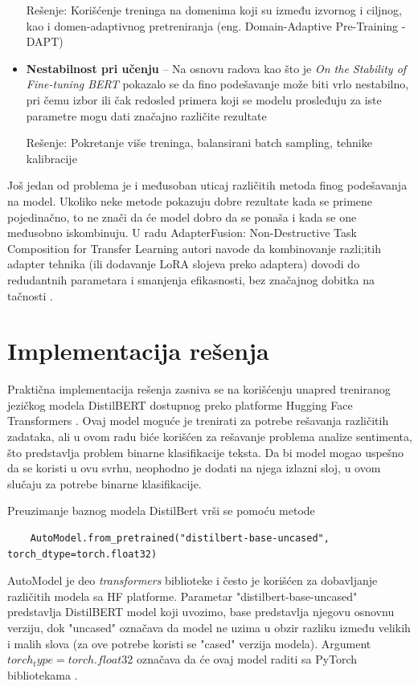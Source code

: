 \documentclass[12pt,oneside]{memoir}
\begin{document}
\begin{itemize}
	Rešenje: Korišćenje treninga na domenima koji su između izvornog i ciljnog, kao i domen-adaptivnog pretreniranja (eng. Domain-Adaptive Pre-Training - DAPT) \cite{ding2023diagnosing}
	
	\item \textbf{Nestabilnost pri učenju} – Na osnovu radova kao što je \textit{On the Stability of Fine-tuning BERT} pokazalo se da fino podešavanje može biti vrlo nestabilno, pri čemu izbor ili čak redosled primera koji se modelu prosleđuju za iste parametre mogu dati značajno različite rezultate
	
	Rešenje: Pokretanje više treninga, balansirani batch sampling, tehnike kalibracije \cite{2025calibration}
	
\end{itemize}


Još jedan od problema je i međusoban uticaj različitih metoda finog podešavanja na model. Ukoliko neke metode pokazuju dobre rezultate kada se primene pojedinačno, to ne znači da će model dobro da se ponaša i kada se one međusobno iskombinuju. U radu AdapterFusion: Non-Destructive Task Composition for Transfer Learning autori navode da kombinovanje razli;itih adapter tehnika (ili dodavanje LoRA slojeva preko adaptera) dovodi do redudantnih parametara i smanjenja efikasnosti, bez značajnog dobitka na tačnosti \cite{pfeiffer2021adapternondestructive}.


\chapter{Implementacija rešenja}
Praktična implementacija rešenja zasniva se na korišćenju unapred treniranog jezičkog modela DistilBERT dostupnog preko platforme Hugging Face Transformers \cite{Huggingface2023}. Ovaj model moguće je trenirati za potrebe rešavanja različitih zadataka, ali u ovom radu biće korišćen za rešavanje problema analize sentimenta, što predstavlja problem binarne klasifikacije teksta. Da bi model mogao uspešno da se koristi u ovu svrhu, neophodno je dodati na njega izlazni sloj, u ovom slučaju za potrebe binarne klasifikacije.

Preuzimanje baznog modela DistilBert vrši se pomoću metode \begin{verbatim}
	AutoModel.from_pretrained("distilbert-base-uncased", torch_dtype=torch.float32)
\end{verbatim}
AutoModel je deo \textit{transformers} biblioteke i često je korišćen za dobavljanje različitih modela sa HF platforme. Parametar "distilbert-base-uncased" predstavlja DistilBERT model koji uvozimo, base predstavlja njegovu osnovnu verziju, dok "uncased" označava da model ne uzima u obzir razliku između velikih i malih slova (za ove potrebe koristi se "cased" verzija modela). Argument \(torch_type=torch.float32\) označava da će ovaj model raditi sa PyTorch bibliotekama \cite{pytorch}.    
\end{document}
